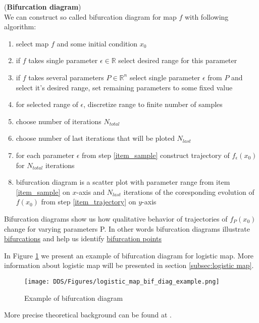 \begin{definition} (\textbf{Bifurcation diagram}) \\
    \label{def: bif_diag}
    We can construct so called bifurcation diagram for map $f$ with following algorithm:
    \begin{enumerate}
        \item select map $f$ and some initial condition $x_0$
        \item if $f$ takes single parameter $\epsilon \in \mathbb{R}$ select desired range for this parameter
        \item if $f$ takes several parameters $P \in \mathbb{R}^n$ select single parameter $\epsilon$ from $P$ and select it's desired range, set remaining parameters to some fixed value
        \item for selected range of $\epsilon$, discretize range to finite number of samples \label{item_sample}
        \item choose number of iterations $N_{total}$
        \item choose number of last iterations that will be ploted $N_{last}$
        \item for each parameter $\epsilon$ from step \ref{item_sample} construct trajectory of $f_{\epsilon}(x_0)$ for $N_{total}$ iterations \label{item_trajectory}
        \item bifurcation diagram is a scatter plot with parameter range from item \ref{item_sample} on $x$-axis and $N_{last}$ iterations of the coresponding evolution of $f(x_0)$ from step \ref{item_trajectory} on $y$-axis
    \end{enumerate}
\end{definition}

\begin{remark}
    Bifurcation diagrams show us how qualitative behavior of trajectories of $f_P(x_0)$ change for varying parameters P.
    In other words bifurcation diagrams illustrate \hyperref[def:bifurcation]{bifurcations} and help us identify \hyperref[def:bifurcation_point]{bifurcation points}
\end{remark}

\begin{example}
    In Figure \ref{fig:bif_diag_example} we present an example of bifurcation diagram for logistic map. More information about logistic map will be presented in section \ref{subsec:logistic map}.
    \begin{figure}[!h]
        \centering
        \texttt{[image: DDS/Figures/logistic\_map\_bif\_diag\_example.png]}
        \caption{Example of bifurcation diagram}
        \label{fig:bif_diag_example}
    \end{figure}
\end{example}

More precise theoretical background can be found at \cite{Devaney20211026,Elaskar2017,Lynch2014}.

\endinput